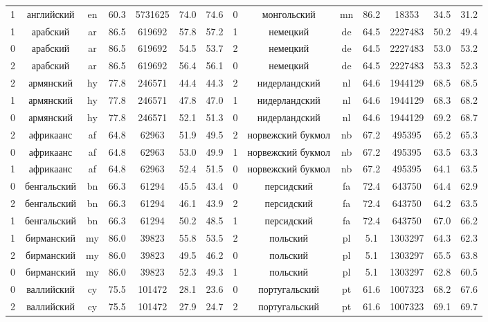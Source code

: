 \begin{table*}
{\begin{tabular}{|c|c|c|c|c|c|c|||c|c|c|c|c|c|c|}
1 & английский & en & 60.3 & 5731625 & 74.0 & 74.6 & 0 & монгольский & mn & 86.2 & 18353 & 34.5 & 31.2\\
1 & арабский & ar & 86.5 & 619692 & 57.8 & 57.2 & 1 & немецкий & de & 64.5 & 2227483 & 50.2 & 49.4\\
0 & арабский & ar & 86.5 & 619692 & 54.5 & 53.7 & 2 & немецкий & de & 64.5 & 2227483 & 53.0 & 53.2\\
2 & арабский & ar & 86.5 & 619692 & 56.4 & 56.1 & 0 & немецкий & de & 64.5 & 2227483 & 53.3 & 52.3\\
2 & армянский & hy & 77.8 & 246571 & 44.4 & 44.3 & 2 & нидерландский & nl & 64.6 & 1944129 & 68.5 & 68.5\\
1 & армянский & hy & 77.8 & 246571 & 47.8 & 47.0 & 1 & нидерландский & nl & 64.6 & 1944129 & 68.3 & 68.2\\
0 & армянский & hy & 77.8 & 246571 & 52.1 & 51.3 & 0 & нидерландский & nl & 64.6 & 1944129 & 69.2 & 68.7\\
2 & африкаанс & af & 64.8 & 62963 & 51.9 & 49.5 & 2 & норвежский букмол & nb & 67.2 & 495395 & 65.2 & 65.3\\
0 & африкаанс & af & 64.8 & 62963 & 53.0 & 49.9 & 1 & норвежский букмол & nb & 67.2 & 495395 & 63.5 & 63.3\\
1 & африкаанс & af & 64.8 & 62963 & 52.4 & 51.5 & 0 & норвежский букмол & nb & 67.2 & 495395 & 64.1 & 63.5\\
0 & бенгальский & bn & 66.3 & 61294 & 45.5 & 43.4 & 0 & персидский & fa & 72.4 & 643750 & 64.4 & 62.9\\
2 & бенгальский & bn & 66.3 & 61294 & 46.1 & 43.9 & 2 & персидский & fa & 72.4 & 643750 & 64.2 & 63.5\\
1 & бенгальский & bn & 66.3 & 61294 & 50.2 & 48.5 & 1 & персидский & fa & 72.4 & 643750 & 67.0 & 66.2\\
1 & бирманский & my & 86.0 & 39823 & 55.8 & 53.5 & 2 & польский & pl & 5.1 & 1303297 & 64.3 & 62.3\\
2 & бирманский & my & 86.0 & 39823 & 49.5 & 46.2 & 0 & польский & pl & 5.1 & 1303297 & 65.5 & 63.8\\
0 & бирманский & my & 86.0 & 39823 & 52.3 & 49.3 & 1 & польский & pl & 5.1 & 1303297 & 62.8 & 60.5\\
0 & валлийский & cy & 75.5 & 101472 & 28.1 & 23.6 & 0 & португальский & pt & 61.6 & 1007323 & 68.2 & 67.6\\
2 & валлийский & cy & 75.5 & 101472 & 27.9 & 24.7 & 2 & португальский & pt & 61.6 & 1007323 & 69.1 & 69.7\\

\end{tabular}}
\end{table*}
